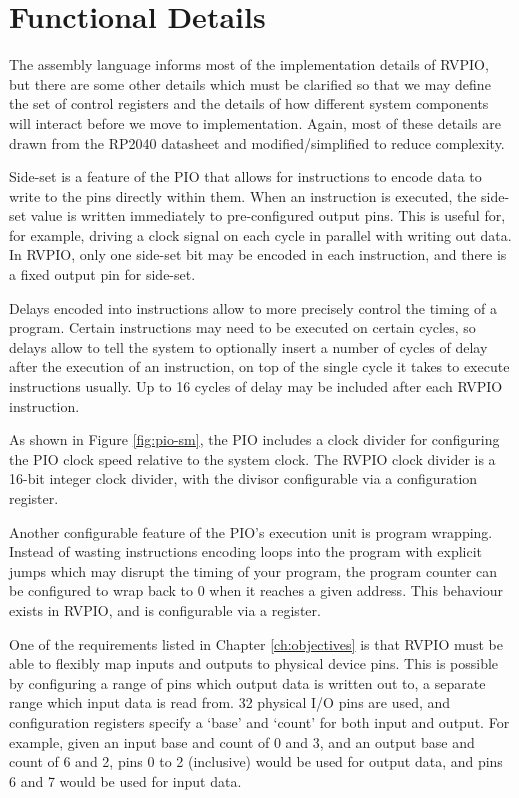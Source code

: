 \section{Functional Details}
\label{sec:functionality}

The assembly language informs most of the implementation details of RVPIO, but there are some other details which must be clarified so that we may define the set of control registers and the details of how different system components will interact before we move to implementation. Again, most of these details are drawn from the RP2040 datasheet \cite{rp2040} and modified/simplified to reduce complexity.

Side-set is a feature of the PIO that allows for instructions to encode data to write to the pins directly within them. When an instruction is executed, the side-set value is written immediately to pre-configured output pins. This is useful for, for example, driving a clock signal on each cycle in parallel with writing out data. In RVPIO, only one side-set bit may be encoded in each instruction, and there is a fixed output pin for side-set.

Delays encoded into instructions allow to more precisely control the timing of a program. Certain instructions may need to be executed on certain cycles, so delays allow to tell the system to optionally insert a number of cycles of delay after the execution of an instruction, on top of the single cycle it takes to execute instructions usually. Up to 16 cycles of delay may be included after each RVPIO instruction.

As shown in Figure \ref{fig:pio-sm}, the PIO includes a clock divider for configuring the PIO clock speed relative to the system clock. The RVPIO clock divider is a 16-bit integer clock divider, with the divisor configurable via a configuration register.

Another configurable feature of the PIO's execution unit is program wrapping. Instead of wasting instructions encoding loops into the program with explicit jumps which may disrupt the timing of your program, the program counter can be configured to wrap back to 0 when it reaches a given address. This behaviour exists in RVPIO, and is configurable via a register.

One of the requirements listed in Chapter \ref{ch:objectives} is that RVPIO must be able to flexibly map inputs and outputs to physical device pins. This is possible by configuring a range of pins which output data is written out to, a separate range which input data is read from. 32 physical I/O pins are used, and configuration registers specify a `base' and `count' for both input and output. For example, given an input base and count of 0 and 3, and an output base and count of 6 and 2, pins 0 to 2 (inclusive) would be used for output data, and pins 6 and 7 would be used for input data.

